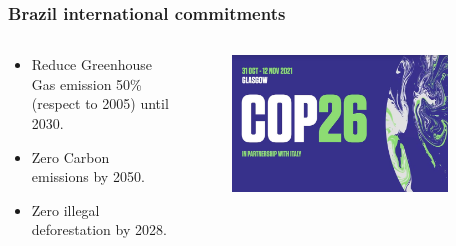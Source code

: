 \documentclass[aspectratio=169]{beamer}
\begin{document}
\begin{frame}
  \frametitle{Brazil international commitments}
  \begin{columns}
    \begin{column}{0.4\textwidth}
      \begin{itemize}
        \item Reduce Greenhouse Gas emission 50\% (respect to 2005) until 2030.
        \item Zero Carbon emissions by 2050.
        \item Zero illegal deforestation by 2028.
      \end{itemize}
    \end{column}
    \begin{column}{0.6\textwidth}
      \begin{figure}
        \centering
        \includegraphics[width=0.9\textwidth]{img/cop26_glasgow.jpg}
        \label{fig:cop26}
      \end{figure}
    \end{column}
  \end{columns}
\end{frame}
\end{document}
